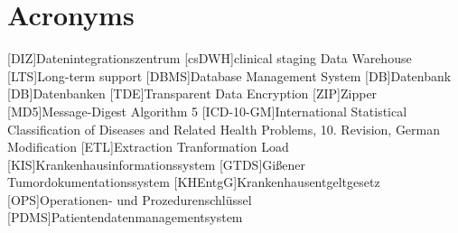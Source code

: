 \chapter*{Acronyms}
    \begin{acronym}[CDW]
    	[DIZ]{Datenintegrationszentrum}
    	[csDWH]{clinical staging Data Warehouse}
    	[LTS]{Long-term support}
    	[DBMS]{Database Management System}
    	[DB]{Datenbank}
    	[DB]{Datenbanken}
    	[TDE]{Transparent Data Encryption}
    	[ZIP]{Zipper}
    	[MD5]{Message-Digest Algorithm 5}
    	[ICD-10-GM]{International Statistical Classification of Diseases and Related Health Problems, 10. Revision, German Modification}
    	[ETL]{Extraction Tranformation Load}
    	[KIS]{Krankenhausinformationssystem}
    	[GTDS]{Gißener Tumordokumentationssystem}
    	[KHEntgG]{Krankenhausentgeltgesetz}
    	[OPS]{Operationen- und Prozedurenschlüssel}
    	[PDMS]{Patientendatenmanagementsystem}
    \end{acronym}